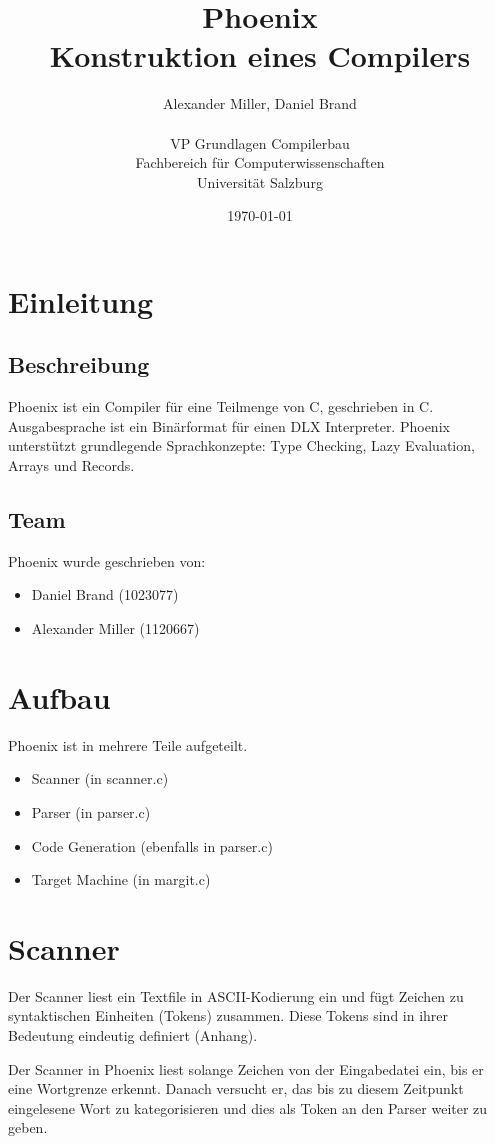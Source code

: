 \documentclass{article}
\title{Phoenix \\ \large Konstruktion eines Compilers}
\author{Alexander Miller, Daniel Brand \\ \\
		VP Grundlagen Compilerbau \\
		Fachbereich für Computerwissenschaften \\
		Universität Salzburg}
\date{\today}
\begin{document}
	\maketitle
	\tableofcontents

	\section{Einleitung}
	\subsection{Beschreibung}
	Phoenix ist ein Compiler für eine Teilmenge von C, geschrieben in C.
	Ausgabesprache ist ein Binärformat für einen DLX Interpreter.
	Phoenix unterstützt grundlegende Sprachkonzepte: Type Checking, Lazy Evaluation, Arrays und Records.

	\subsection{Team}
	Phoenix wurde geschrieben von:
	\begin{itemize}
		\item Daniel Brand (1023077)
		\item Alexander Miller (1120667)
	\end{itemize}

	\section{Aufbau}
	Phoenix ist in mehrere Teile aufgeteilt.
	\begin{itemize}
		\item Scanner (in scanner.c)
		\item Parser (in parser.c)
		\item Code Generation (ebenfalls in parser.c)
		\item Target Machine (in margit.c)
	\end{itemize}


	\section{Scanner}
	Der Scanner liest ein Textfile in ASCII-Kodierung ein und fügt Zeichen zu syntaktischen Einheiten (Tokens) zusammen.
	Diese Tokens sind in ihrer Bedeutung eindeutig definiert (Anhang).

	Der Scanner in Phoenix liest solange Zeichen von der Eingabedatei ein, bis er eine Wortgrenze erkennt.
	Danach versucht er, das bis zu diesem Zeitpunkt eingelesene Wort zu kategorisieren und dies als Token an den Parser weiter zu geben.
\end{document}
